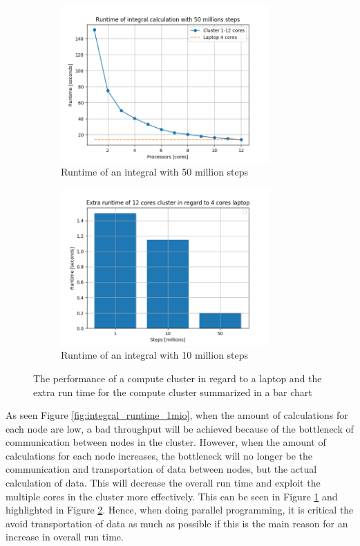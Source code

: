 \documentclass[../Head/Report.tex]{subfiles}
\begin{document}
\begin{figure}[H]
\centering
\captionsetup{justification=centering}
  \begin{subfigure}[b]{0.48\textwidth}
  \centering
    \includegraphics[height=6cm]{../Figures/integral_runtime_test_50mio.png}
    \caption{Runtime of an integral with 50 million steps}
    \label{fig:integral_runtime_50mio}
  \end{subfigure}
  \hfill
  \begin{subfigure}[b]{0.48\textwidth}
  \centering
    \includegraphics[height=6cm]{../Figures/barchart_runtime.png}
    \caption{Runtime of an integral with 10 million steps}
    \label{fig:extra_runtime_cluster}
  \end{subfigure}
  \caption{The performance of a compute cluster in regard to a laptop and the extra run time for the compute cluster summarized in a bar chart}
  \label{fig:integral_runtime_50_mio_barchart}
\end{figure}

As seen Figure \ref{fig:integral_runtime_1mio}, when the amount of calculations for each node are low, a bad throughput will be achieved because of the bottleneck of communication between nodes in the cluster. However, when the amount of calculations for each node increases, the bottleneck will no longer be the communication and transportation of data between nodes, but the actual calculation of data. This will decrease the overall run time and exploit the multiple cores in the cluster more effectively. This can be seen in Figure \ref{fig:integral_runtime_50mio} and highlighted in Figure \ref{fig:extra_runtime_cluster}. Hence, when doing parallel programming, it is critical the avoid transportation of data as much as possible if this is the main reason for an increase in overall run time. 
\end{document}

